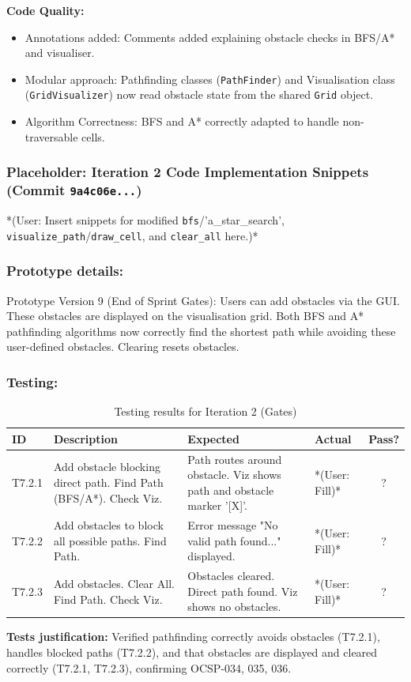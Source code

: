 \textbf{Code Quality:}
\begin{itemize}
	\item Annotations added: Comments added explaining obstacle checks in BFS/A* and visualiser.
	\item Modular approach: Pathfinding classes (\verb|PathFinder|) and Visualisation class (\verb|GridVisualizer|) now read obstacle state from the shared \verb|Grid| object.
	\item Algorithm Correctness: BFS and A* correctly adapted to handle non-traversable cells.
\end{itemize}

\newpage
\subsubsection*{Placeholder: Iteration 2 Code Implementation Snippets (Commit \verb|9a4c06e...|)}
*(User: Insert snippets for modified \verb|bfs|/'a_star_search', \verb|visualize_path|/\verb|draw_cell|, and \verb|clear_all| here.)*
\newpage

\subsubsection{Prototype details:}
Prototype Version 9 (End of Sprint Gates): Users can add obstacles via the GUI. These obstacles are displayed on the visualisation grid. Both BFS and A* pathfinding algorithms now correctly find the shortest path while avoiding these user-defined obstacles. Clearing resets obstacles.

\subsubsection{Testing:}
\begin{table}[htbp]
	\centering
	\begin{tabularx}{\textwidth}{|l|X|p{4.5cm}|p{1.5cm}|c|}
		\hline
		\textbf{ID} & \textbf{Description} & \textbf{Expected} & \textbf{Actual} & \textbf{Pass?} \\
		\hline
		T7.2.1 & Add obstacle blocking direct path. Find Path (BFS/A*). Check Viz. & Path routes around obstacle. Viz shows path and obstacle marker '[X]'. & *(User: Fill)* & ? \\
		\hline
		T7.2.2 & Add obstacles to block all possible paths. Find Path. & Error message "No valid path found..." displayed. & *(User: Fill)* & ? \\
		\hline
		T7.2.3 & Add obstacles. Clear All. Find Path. Check Viz. & Obstacles cleared. Direct path found. Viz shows no obstacles. & *(User: Fill)* & ? \\
		\hline
	\end{tabularx}
	\caption{Testing results for Iteration 2 (Gates)}
\end{table}
\textbf{Tests justification:} Verified pathfinding correctly avoids obstacles (T7.2.1), handles blocked paths (T7.2.2), and that obstacles are displayed and cleared correctly (T7.2.1, T7.2.3), confirming OCSP-034, 035, 036.

